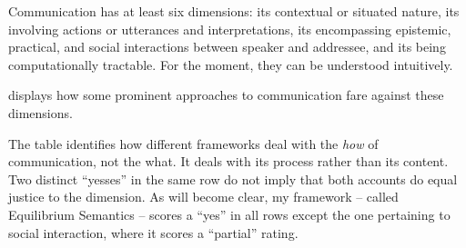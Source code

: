 Communication has at least six dimensions: its contextual or situated nature, its involving actions or utterances and interpretations, its encompassing epistemic, practical, and social interactions between speaker and addressee, and its being computationally tractable. For the moment, they can be understood intuitively.

 displays how some prominent approaches to communication fare against these dimensions.

\begin{table}
\caption{Summary of theories of communication\label{tab:SummaryofTheories}}
\end{table}

\noindent The table identifies how different frameworks deal with the \emph{how} of communication, not the what. It deals with its process rather than its content. Two distinct ``yesses'' in the same row do not imply that both accounts do equal justice to the dimension. As will become clear, my framework -- called Equilibrium Semantics -- scores a ``yes'' in all rows except the one pertaining to social interaction, where it scores a ``partial'' rating.


